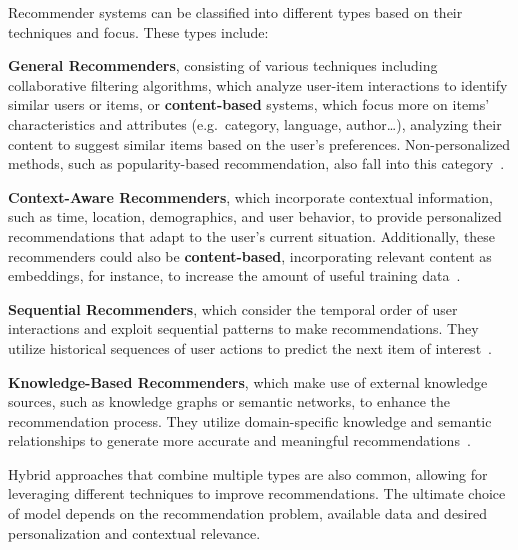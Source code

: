 Recommender systems can be classified into different types based on their techniques and focus. These types include:
\begin{compactitem}[\textbullet]
    \item \textbf{General Recommenders}, consisting of various techniques including collaborative filtering algorithms, which analyze user-item interactions to identify similar users or items, or \textbf{content-based} systems, which focus more on items' characteristics and attributes (e.g.\ category, language, author\ldots), analyzing their content to suggest similar items based on the user's preferences. Non-personalized methods, such as popularity-based recommendation, also fall into this category~\cite{CHAPTER:RS-HANDBOOK-GENERAL}.
    \item \textbf{Context-Aware Recommenders}, which incorporate contextual information, such as time, location, demographics, and user behavior, to provide personalized recommendations that adapt to the user's current situation. Additionally, these recommenders could also be \textbf{content-based}, incorporating relevant content as embeddings, for instance, to increase the amount of useful training data~\cite{CHAPTER:RS-HANDBOOK-CONTEXT}.
    \item \textbf{Sequential Recommenders}, which consider the temporal order of user interactions and exploit sequential patterns to make recommendations. They utilize historical sequences of user actions to predict the next item of interest~\cite[Chapter 3.5]{CHAPTER:RS-HANDBOOK-MUSIC}.
    \item \textbf{Knowledge-Based Recommenders}, which make use of external knowledge sources, such as knowledge graphs or semantic networks, to enhance the recommendation process. They utilize domain-specific knowledge and semantic relationships to generate more accurate and meaningful recommendations~\cite{CHAPTER:RS-HANDBOOK-KNOWLEDGE}.
\end{compactitem}
Hybrid approaches that combine multiple types are also common, allowing for leveraging different techniques to improve recommendations. The ultimate choice of model depends on the recommendation problem, available data and desired personalization and contextual relevance.